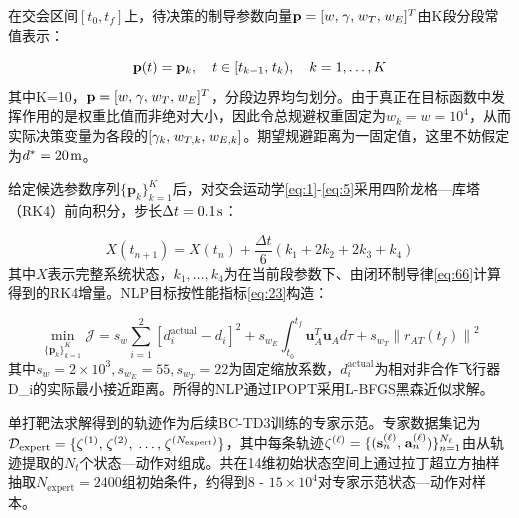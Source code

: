 在交会区间$[{t_0},{t_f}]$上，待决策的制导参数向量${\mathbf{p}} = {[w,{\kern 1pt} \gamma ,{\kern 1pt} {w_T},{\kern 1pt} {w_E}]^T}$由K段分段常值表示：

\begin{equation}
\label{eq:69}
{\mathbf{p}}(t) = {{\mathbf{p}}_k},\quad t \in [{t_{k - 1}},{\kern 1pt} {t_k}),\quad k = 1, \ldots ,K
\end{equation}
其中K=10，${\mathbf{p}} = {[w,{\kern 1pt} \gamma ,{\kern 1pt} {w_T},{\kern 1pt} {w_E}]^T}$，分段边界均匀划分。由于真正在目标函数中发挥作用的是权重比值而非绝对大小，因此令总规避权重固定为${w_k} = w = {10^4}$，从而实际决策变量为各段的$[{\gamma _k},{\kern 1pt} {w_{T,k}},{\kern 1pt} {w_{E,k}}]$。期望规避距离为一固定值，这里不妨假定为${d^*} = 20{\kern 1pt} {\text{m}}$。

给定候选参数序列$\{ {{\mathbf{p}}_k}\} _{k = 1}^K$后，对交会运动学\eqref{eq:1}-\eqref{eq:5}采用四阶龙格—库塔（RK4）前向积分，步长$\Delta t = 0.1{\kern 1pt} {\text{s}}$：

\begin{equation}
\label{eq:70}
X({t_{n + 1}}) = X({t_n}) + \frac{{\Delta t}}{6}({k_1} + 2{k_2} + 2{k_3} + {k_4})
\end{equation}
其中$X$表示完整系统状态，${k_1}, \ldots ,{k_4}$为在当前段参数下、由闭环制导律\eqref{eq:66}计算得到的RK4增量。NLP目标按性能指标\eqref{eq:23}构造：

\begin{equation}
\label{eq:71}
\mathop {\min }\limits_{\{ {{\mathbf{p}}_k}\} _{k = 1}^K} \mathcal{J} = {s_w}\sum\limits_{i = 1}^2 {{{\left[ {d_i^{{\text{actual}}} - {d_i}} \right]}^2}}  + {s_{{w_E}}}\int_{{t_0}}^{{t_f}} {{\mathbf{u}}_A^T{{\mathbf{u}}_A}d\tau }  + {s_{{w_T}}}{\left\| {{r_{AT}}({t_f})} \right\|^2}
\end{equation}
其中${s_w} = 2 \times {10^3},{s_{{w_E}}} = 55,{s_{{w_T}}} = 22$为固定缩放系数，$d_i^{{\text{actual}}}$为相对非合作飞行器D\_i的实际最小接近距离。所得的NLP通过IPOPT采用L-BFGS黑森近似求解。

单打靶法求解得到的轨迹作为后续BC-TD3训练的专家示范。专家数据集记为${\mathcal{D}_{{\text{expert}}}} = \{ {\zeta ^{(1)}},{\kern 1pt} {\zeta ^{(2)}},{\kern 1pt}  \ldots ,{\kern 1pt} {\zeta ^{({N_{{\text{expert}}}})}}\} $，其中每条轨迹${\zeta ^{(\ell )}} = \{ ({\mathbf{s}}_n^{(\ell )},{\kern 1pt} {\mathbf{a}}_n^{(\ell )})\} _{n = 1}^{{N_\ell }}$由从轨迹提取的${N_t}$个状态—动作对组成。共在14维初始状态空间上通过拉丁超立方抽样抽取${N_{{\text{expert}}}} = 2400$组初始条件，约得到$8{\text{ - }}15 \times {10^4}$对专家示范状态—动作对样本。

